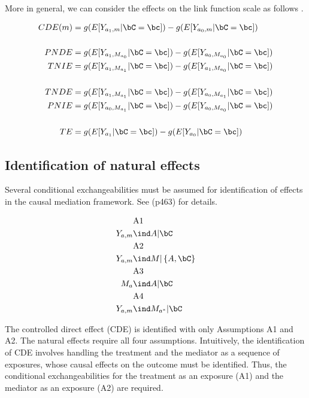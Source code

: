 \documentclass[dvipdfmx,10pt]{article}
\begin{document}
More in general, we can consider the effects on the link function scale as follows \cite{starkopfComparisonFiveSoftware2017}.

\begin{align*}
  CDE(m) &= g(E[Y_{a_{1},m} | \bC = \bc]) - g(E[Y_{a_{0},m} | \bC = \bc])\\
  \\
  PNDE &= g(E[Y_{a_{1},M_{a_{0}}} | \bC = \bc]) - g(E[Y_{a_{0},M_{a_{0}}} | \bC = \bc])\\
  TNIE &= g(E[Y_{a_{1},M_{a_{1}}} | \bC = \bc]) - g(E[Y_{a_{1},M_{a_{0}}} | \bC = \bc])\\
  \\
  TNDE &= g(E[Y_{a_{1},M_{a_{1}}} | \bC = \bc]) - g(E[Y_{a_{0},M_{a_{1}}} | \bC = \bc])\\
  PNIE &= g(E[Y_{a_{0},M_{a_{1}}} | \bC = \bc]) - g(E[Y_{a_{0},M_{a_{0}}} | \bC = \bc])\\
  \\
  TE &= g(E[Y_{a_{1}} | \bC = \bc]) - g(E[Y_{a_{0}} | \bC = \bc])\\
\end{align*}


\subsection{Identification of natural effects}
\label{sec:orge86d2fe}
Several conditional exchangeabilities must be assumed for identification of effects in the causal mediation framework. See \cite{vanderweeleExplanationCausalInference2015} (p463) for details.

\begin{align*}
  &\text{A1}\\
  Y_{a,m} &\ind A | \bC\\
  &\text{A2}\\
  Y_{a,m} &\ind M | \left\{ A, \bC \right\}\\
  &\text{A3}\\
  M_{a} &\ind A | \bC\\
  &\text{A4}\\
  Y_{a,m} &\ind M_{a^{*}} |\bC\\
\end{align*}

The controlled direct effect (CDE) is identified with only Assumptions A1 and A2. The natural effects require all four assumptions.  Intuitively, the identification of CDE involves handling the treatment and the mediator as a sequence of exposures, whose causal effects on the outcome must be identified. Thus, the conditional exchangeabilities for the treatment as an exposure (A1) and the mediator as an exposure (A2) are required.\\
\end{document}
